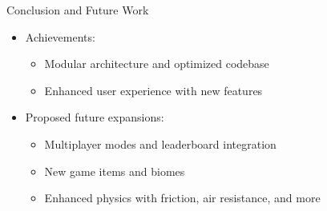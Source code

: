 \begin{frame}{Conclusion and Future Work}
    \begin{itemize}
        \item Achievements:
        \begin{itemize}
            \item Modular architecture and optimized codebase
            \item Enhanced user experience with new features
        \end{itemize}
        \item Proposed future expansions:
        \begin{itemize}
            \item Multiplayer modes and leaderboard integration
            \item New game items and biomes
            \item Enhanced physics with friction, air resistance, and more
        \end{itemize}
    \end{itemize}
\end{frame}